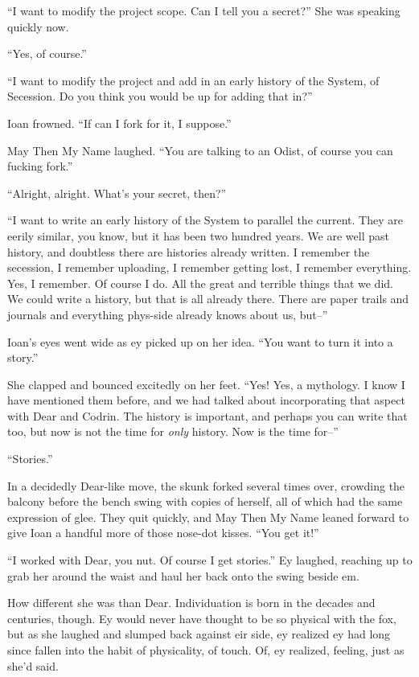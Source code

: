 ``I want to modify the project scope. Can I tell you a secret?'' She was speaking quickly now.

``Yes, of course.''

``I want to modify the project and add in an early history of the System, of Secession. Do you think you would be up for adding that in?''

Ioan frowned. ``If can I fork for it, I suppose.''

May Then My Name laughed. ``You are talking to an Odist, of course you can fucking fork.''

``Alright, alright. What's your secret, then?''

``I want to write an early history of the System to parallel the current. They are eerily similar, you know, but it has been two hundred years. We are well past history, and doubtless there are histories already written. I remember the secession, I remember uploading, I remember getting lost, I remember everything. Yes, I remember. Of course I do. All the great and terrible things that we did. We could write a history, but that is all already there. There are paper trails and journals and everything phys-side already knows about us, but--''

Ioan's eyes went wide as ey picked up on her idea. ``You want to turn it into a story.''

She clapped and bounced excitedly on her feet. ``Yes! Yes, a mythology. I know I have mentioned them before, and we had talked about incorporating that aspect with Dear and Codrin. The history is important, and perhaps you can write that too, but now is not the time for \emph{only} history. Now is the time for--''

``Stories.''

In a decidedly Dear-like move, the skunk forked several times over, crowding the balcony before the bench swing with copies of herself, all of which had the same expression of glee. They quit quickly, and May Then My Name leaned forward to give Ioan a handful more of those nose-dot kisses. ``You get it!''

``I worked with Dear, you nut. Of course I get stories.'' Ey laughed, reaching up to grab her around the waist and haul her back onto the swing beside em.

How different she was than Dear. Individuation is born in the decades and centuries, though. Ey would never have thought to be so physical with the fox, but as she laughed and slumped back against eir side, ey realized ey had long since fallen into the habit of physicality, of touch. Of, ey realized, feeling, just as she'd said.
